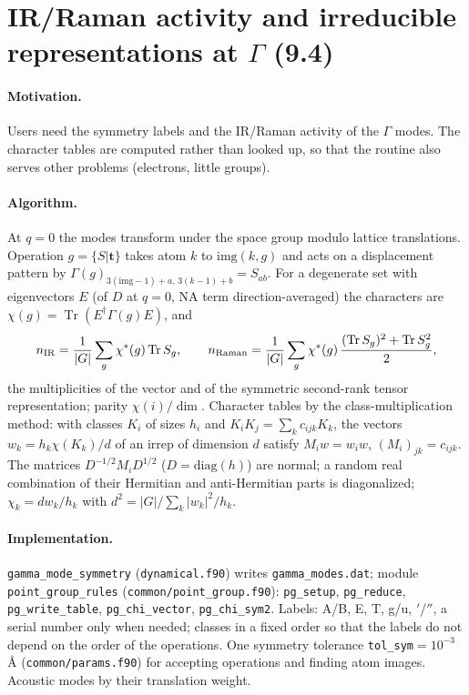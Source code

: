 \documentclass[11pt,a4paper]{article}
\newcommand{\bt}{\mathbf t}
\newcommand{\code}[1]{\texttt{#1}}
\newcommand{\Tr}{\operatorname{Tr}}
\begin{document}
\section{\texorpdfstring{IR/Raman activity and irreducible representations at $\Gamma$ (9.4)}{IR/Raman activity and irreducible representations at Gamma (9.4)}}
\paragraph{Motivation.} Users need the symmetry labels and the IR/Raman activity of the $\Gamma$ modes. The
character tables are computed rather than looked up, so that the routine also serves other problems
(electrons, little groups).

\paragraph{Algorithm.} At $q=0$ the modes transform under the space group modulo lattice translations.
Operation $g=\{S|\bt\}$ takes atom $k$ to $\mathrm{img}(k,g)$ and acts on a displacement pattern by
$\Gamma(g)_{3(\mathrm{img}-1)+a,\,3(k-1)+b}=S_{ab}$. For a degenerate set with eigenvectors $E$ (of $D$ at
$q=0$, NA term direction-averaged) the characters are $\chi(g)=\Tr(E^\dagger\Gamma(g)E)$, and
\begin{equation}
n_{\rm IR}=\frac1{|G|}\sum_g\chi^*(g)\Tr S_g,\qquad
n_{\rm Raman}=\frac1{|G|}\sum_g\chi^*(g)\,\frac{(\Tr S_g)^2+\Tr S_g^2}2 ,
\end{equation}
the multiplicities of the vector and of the symmetric second-rank tensor representation; parity
$\chi(i)/\dim$. Character tables by the class-multiplication method: with classes $K_i$ of sizes $h_i$ and
$K_iK_j=\sum_kc_{ijk}K_k$, the vectors $w_k=h_k\chi(K_k)/d$ of an irrep of dimension $d$ satisfy
$M_iw=w_iw$, $(M_i)_{jk}=c_{ijk}$. The matrices $D^{-1/2}M_iD^{1/2}$ ($D=\mathrm{diag}(h)$) are normal; a random
real combination of their Hermitian and anti-Hermitian parts is diagonalized; $\chi_k=dw_k/h_k$ with
$d^2=|G|/\sum_k|w_k|^2/h_k$.

\paragraph{Implementation.} \code{gamma\_mode\_symmetry} (\code{dynamical.f90}) writes
\code{gamma\_modes.dat}; module \code{point\_group\_rules} (\code{common/point\_group.f90}): \code{pg\_setup},
\code{pg\_reduce}, \code{pg\_write\_table}, \code{pg\_chi\_vector}, \code{pg\_chi\_sym2}. Labels: A/B, E, T,
g/u, $'$/$''$, a serial number only when needed; classes in a fixed order so that the labels do not depend
on the order of the operations. One symmetry tolerance \code{tol\_sym}$=10^{-3}$\,\AA{} (\code{common/params.f90})
for accepting operations and finding atom images. Acoustic modes by their translation weight.
\end{document}
